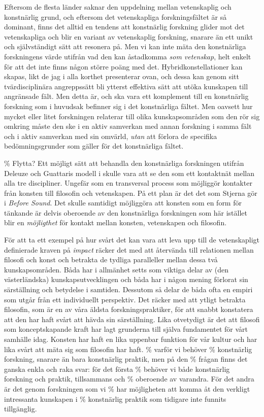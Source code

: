 \documentclass[11pt]{article}
\begin{document}
Eftersom de flesta länder saknar den uppdelning mellan vetenskaplig
och konstnärlig grund, och eftersom det vetenskapliga forskningsfältet
är så dominant, finns det alltid en tendens att konstnärlig forskning
glider mot det vetenskapliga och blir en variant av vetenskaplig
forskning, snarare än ett unikt och självständigt sätt att resonera på. Men vi kan inte
mäta den konstnärliga forskningens värde utifrån vad den kan
åstadkomma \emph{som vetenskap}, helt enkelt för att det inte finns
någon större poäng med det. Hybridkonstellationer kan skapas, likt de
jag i alla korthet presenterar ovan, och dessa kan genom sitt
tvärdisciplinära angreppssätt bli ytterst effektiva sätt att utöka
kunskapen till angränsade fält. Men detta är, och ska vara ett
komplement till en konstnärlig forskning som i huvudsak befinner sig i
det konstnärliga fältet. Men oavsett hur mycket eller litet forskningen relaterar till
olika kunskapsområden som den rör sig omkring måste den ske i en aktiv
samverkan med annan forskning i samma fält och i aktiv samverkan med
sin omvärld, \emph{utan} att förlora de specifika bedömningsgrunder som
gäller för det konstnärliga fältet.

\% Flytta?
Ett möjligt sätt att behandla den konstnärliga forskningen utifrån
Deleuze och Guattaris modell i  skulle vara att
se den som ett kontaktnät mellan alla tre discipliner. Ungefär som en
transversal process som möjliggör kontakter från konsten till
filosofin och vetenskapen. På ett plan är det det som Stjerna gör i
\emph{Before Sound}. Det skulle samtidigt möjliggöra att konsten som
en form för tänkande är delvis oberoende av den konstnärliga
forskningen som här istället blir en \emph{möjligthet} för kontakt
mellan konsten, vetenskapen och filosofin.

För att ta ett exempel på hur svårt det kan vara att leva upp till de
vetenskapligt definierade kraven på \emph{impact} räcker det med att
återvända till relationen mellan filosofi och konst och betrakta de
tydliga paralleller mellan dessa två kunskapsområden. Båda har i
allmänhet setts som viktiga delar av (den västerländska)
kunskapsutvecklingen och båda har i någon mening förlorat sin
särställning och betydelse i samtiden. Dessutom så delar de båda ofta
en empiri som utgår från ett individuellt perspektiv. Det räcker med
att ytligt betrakta filosofin, som är en av våra äldsta
forskningspraktiker, för att snabbt konstatera att den har haft svårt
att hävda sin särställning. Lika otvetydigt är det att filosofi som
konceptskapande kraft har lagt grunderna till själva fundamentet för
vårt samhälle idag. Konsten har haft en lika uppenbar funktion för vår
kultur och har lika svårt att mäta sig som filosofin har haft.  \% varför vi behöver
\% konstnärlig forskning, snarare än bara konstnärlig praktik, men på den
\% frågan finns det ganska enkla och raka svar: för det första
\% behöver vi både konstnärlig forskning och praktik, tillsammans och
\% oberoende av varandra. För det andra är det genom forskningen som vi
\% har möjligheten att komma åt den verkligt intressanta kunskapen i
\% konstnärlig praktik som tidigare inte funnits tillgänglig.
\end{document}
